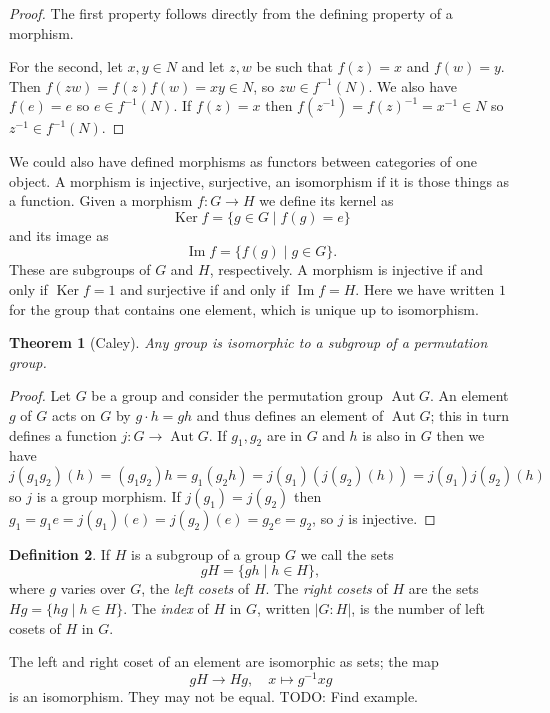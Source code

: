 \documentclass[11pt]{article}
\newtheorem{theo}{Theorem}
\theoremstyle{definition}
\newtheorem{defi}[theo]{Definition}
\DeclareMathOperator{\aut}{Aut}
\DeclareMathOperator{\ke}{Ker}
\DeclareMathOperator{\im}{Im}
\begin{document}
\begin{proof}
The first property follows directly from the defining property of a morphism.

For the second, let $x,y \in N$ and let $z,w$ be such that $f(z) = x$ and $f(w)
= y$.
Then $f(zw) = f(z) f(w) = xy \in N$, so $zw \in f^{-1}(N)$.
We also have $f(e) = e$ so $e \in f^{-1}(N)$.
If $f(z) = x$ then $f(z^{-1}) = f(z)^{-1} = x^{-1} \in N$ so $z^{-1} \in
f^{-1}(N)$.
\end{proof}



We could also have defined morphisms as functors between categories of one object.
A morphism is injective, surjective, an isomorphism if it is those things as a
function.
Given a morphism $f : G \to H$ we define its kernel as
$$
\ke f = \{ g \in G \mid f(g) = e \}
$$
and its image as
$$
\im f = \{ f(g) \mid g \in G \}.
$$
These are subgroups of $G$ and $H$, respectively.
A morphism is injective if and only if $\ke f = 1$ and surjective if and only
if $\im f = H$.
Here we have written $1$ for the group that contains one element, which is
unique up to isomorphism.


\begin{theo}[Caley]
Any group is isomorphic to a subgroup of a permutation group.
\end{theo}

\begin{proof}
Let $G$ be a group and consider the permutation group $\aut G$.
An element $g$ of $G$ acts on $G$ by $g \cdot h = gh$ and thus defines an
element of $\aut G$; this in turn defines a function $j : G \to \aut G$.
If $g_1, g_2$ are in $G$ and $h$ is also in $G$ then we have
$$
j(g_1 g_2)(h)
= (g_1 g_2) h
= g_1 (g_2 h)
= j(g_1)(j(g_2)(h))
= j(g_1) j(g_2) (h)
$$
so $j$ is a group morphism. If $j(g_1) = j(g_2)$ then $g_1 = g_1 e = j(g_1)(e)
= j(g_2)(e) = g_2 e = g_2$, so $j$ is injective.
\end{proof}


\begin{defi}
If $H$ is a subgroup of a group $G$ we call the sets
$$
gH = \{ gh \mid h \in H \},
$$
where $g$ varies over $G$, the \emph{left cosets} of $H$.
The \emph{right cosets} of $H$ are the sets $Hg = \{ hg \mid h \in H \}$.
The \emph{index} of $H$ in $G$, written $|G : H|$, is the number of left cosets
of $H$ in $G$.
\end{defi}

The left and right coset of an element are isomorphic as sets; the map
$$
gH \longrightarrow Hg,
\quad
x \mapsto g^{-1} x g
$$
is an isomorphism.
They may not be equal.
TODO: Find example.
\end{document}
